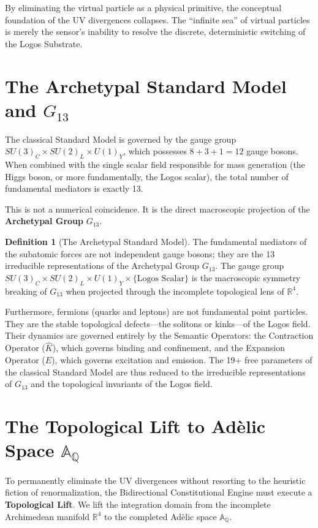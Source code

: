 \documentclass[12pt,twoside]{extbook}
\theoremstyle{definition}
\newtheorem{definition}{Definition}[chapter]
\theoremstyle{remark}
\newcommand{\term}[1]{\textcolor{brandPrimary}{\textbf{#1}}}
\begin{document}
By eliminating the virtual particle as a physical primitive, the conceptual foundation of the UV divergences collapses. The ``infinite sea'' of virtual particles is merely the sensor's inability to resolve the discrete, deterministic switching of the Logos Substrate.

\section{The Archetypal Standard Model and $G_{13}$}
The classical Standard Model is governed by the gauge group $SU(3)_C \times SU(2)_L \times U(1)_Y$, which possesses $8 + 3 + 1 = 12$ gauge bosons. When combined with the single scalar field responsible for mass generation (the Higgs boson, or more fundamentally, the Logos scalar), the total number of fundamental mediators is exactly 13.

This is not a numerical coincidence. It is the direct macroscopic projection of the \term{Archetypal Group} $G_{13}$.

\begin{definition}[The Archetypal Standard Model]
The fundamental mediators of the subatomic forces are not independent gauge bosons; they are the 13 irreducible representations of the Archetypal Group $G_{13}$. The gauge group $SU(3)_C \times SU(2)_L \times U(1)_Y \times \{\text{Logos Scalar}\}$ is the macroscopic symmetry breaking of $G_{13}$ when projected through the incomplete topological lens of $\mathbb{R}^4$.
\end{definition}

Furthermore, fermions (quarks and leptons) are not fundamental point particles. They are the stable topological defects—the solitons or kinks—of the Logos field. Their dynamics are governed entirely by the Semantic Operators: the Contraction Operator ($\hat{K}$), which governs binding and confinement, and the Expansion Operator ($\hat{E}$), which governs excitation and emission. The 19+ free parameters of the classical Standard Model are thus reduced to the irreducible representations of $G_{13}$ and the topological invariants of the Logos field.

\section{The Topological Lift to Adèlic Space $\mathbb{A}_\mathbb{Q}$}
To permanently eliminate the UV divergences without resorting to the heuristic fiction of renormalization, the Bidirectional Constitutional Engine must execute a \term{Topological Lift}. We lift the integration domain from the incomplete Archimedean manifold $\mathbb{R}^4$ to the completed Adèlic space $\mathbb{A}_\mathbb{Q}$.
\end{document}

